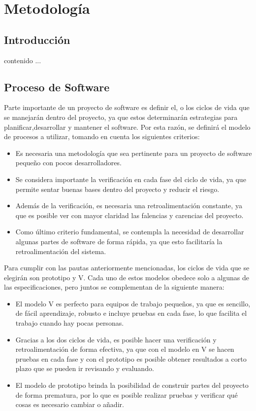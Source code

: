 \chapter{Metodología}
\section{Introducción}
contenido ...
\newpage

\section{Proceso de Software}
Parte importante de un proyecto de software es definir el, o los ciclos de vida que se manejarán dentro del proyecto, ya que estos determinarán estrategias para planificar,desarrollar y mantener el software. Por esta razón, se definirá el modelo de procesos a utilizar, tomando en cuenta los siguientes criterios:
\begin{itemize}
	\item Es necesaria una metodología que sea pertinente para un proyecto de software pequeño con pocos desarrolladores.
	\item Se considera importante la verificación en cada fase del ciclo de vida, ya que permite sentar buenas bases dentro del proyecto y reducir el riesgo.
	\item Además de la verificación, es necesaria una retroalimentación constante, ya que es posible ver con mayor claridad las falencias y carencias del proyecto.
	\item Como último criterio fundamental, se contempla la necesidad de desarrollar algunas partes de software de forma rápida, ya que esto facilitaría la retroalimentación del sistema.
\end{itemize}
Para cumplir con las pautas anteriormente mencionadas, los ciclos de vida que se elegirán son prototipo y V. Cada uno de estos modelos obedece solo a algunas de las especificaciones, pero juntos se complementan de la siguiente manera:
\begin{itemize}
	\item El modelo V es perfecto para equipos de trabajo pequeños, ya que es sencillo, de fácil aprendizaje, robusto e incluye pruebas en cada fase, lo que facilita el trabajo cuando hay pocas personas. 
	\item Gracias a los dos ciclos de vida, es posible hacer una verificación y retroalimentación de forma efectiva, ya que con el modelo en V se hacen pruebas en cada fase y con el prototipo es posible obtener resultados a corto plazo que se pueden ir revisando y evaluando.
	\item El modelo de prototipo brinda la posibilidad de construir partes del proyecto de forma prematura, por lo que es posible realizar pruebas y verificar qué cosas es necesario cambiar o añadir.
\end{itemize}
